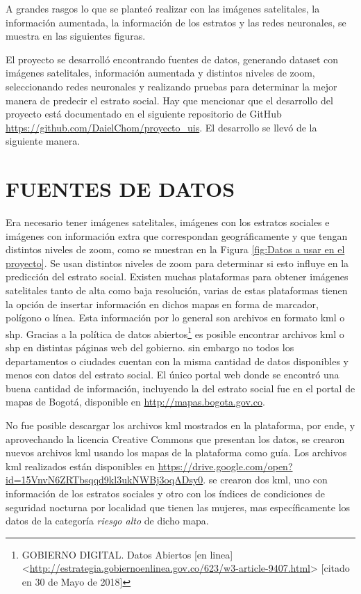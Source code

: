 A grandes rasgos lo que se planteó realizar con las imágenes satelitales, la información aumentada, la información de los estratos y las redes neuronales, se muestra en las siguientes figuras.

 {}

El proyecto se desarrolló encontrando fuentes de datos, generando dataset con imágenes satelitales, información aumentada y distintos niveles de zoom, seleccionando redes neuronales y realizando pruebas para determinar la mejor manera de predecir el estrato social. Hay que mencionar que el desarrollo del proyecto está documentado en el siguiente repositorio de GitHub \url{https://github.com/DaielChom/proyecto_uis}. El desarrollo se llevó de la siguiente manera.

 
 \section{FUENTES DE DATOS}
 
 Era necesario tener imágenes satelitales, imágenes con los estratos sociales e imágenes con información extra que correspondan geográficamente y que tengan distintos niveles de zoom, como se muestran en la Figura \ref{fig:Datos a usar en el proyecto}. Se usan distintos niveles de zoom para determinar si esto influye en la predicción del estrato social. Existen muchas plataformas para obtener imágenes satelitales tanto de alta como baja resolución, varias de estas plataformas tienen la opción de insertar información en dichos mapas en forma de marcador, polígono o línea. Esta información por lo general son archivos en formato kml o shp. Gracias a la política de datos abiertos\footnote[13]{GOBIERNO DIGITAL. Datos Abiertos [en linea] <\url{http://estrategia.gobiernoenlinea.gov.co/623/w3-article-9407.html}> [citado en 30 de Mayo de 2018]} es posible encontrar archivos kml o shp en distintas páginas web del gobierno. sin embargo no todos los departamentos o ciudades cuentan con la misma cantidad de datos disponibles y menos con datos del estrato social. El único portal web donde se encontró una buena cantidad de información, incluyendo la del estrato social fue en el portal de mapas de Bogotá, disponible en \url{http://mapas.bogota.gov.co}.
 
 No fue posible descargar los archivos kml mostrados en la plataforma, por ende, y aprovechando la licencia Creative Commons que presentan los datos, se crearon nuevos archivos kml usando los mapas de la plataforma como guía. Los archivos kml realizados están disponibles en \url{https://drive.google.com/open?id=15VnvN6ZRTbsqqd9kl3ukNWBj3oqADsy0}. se crearon dos kml, uno con información de los estratos sociales y otro con los índices de condiciones de seguridad nocturna por localidad que tienen las mujeres, mas específicamente los datos de la categoría \textit{riesgo alto} de dicho mapa. 

